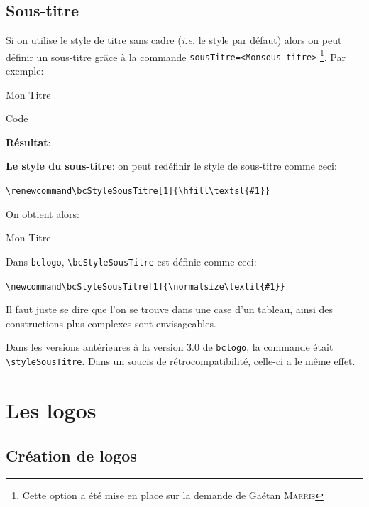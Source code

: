 \documentclass[a4paper,10pt,frenchb]{article}
\newenvironment*{demo}{%
\VerbatimOut{toto.txt}%
}%
{%
\endVerbatimOut%
\begin{bclogo}[margeG=1,logo=\bccrayon,couleurBarre=Gray,barre=wave,noborder]{Code}%
\begin{footnotesize}%
%
\end{footnotesize}%
\end{bclogo}%
\noindent\textbf{Résultat}:\par\smallskip
%
}%
\newcommand*\cmd{\color{Maroon}}%
\begin{document}
\subsection{Sous-titre}

Si on utilise le style de titre sans cadre (\textit{i.e.} le style par
défaut) alors on peut définir un sous-titre grâce à la commande
{\cmd\verb|sousTitre=<Monsous-titre>|}
\footnote{Cette option a été mise en place sur la demande de Gaétan
\textsc{Marris}}. Par exemple:

\begin{demo}
\begin{bclogo}[couleur=blue!30,arrondi=0.1,sousTitre=Sous-titre]{Mon Titre}%
  \lipsum[2]
\end{bclogo}
\end{demo}

\noindent\textbf{Le style du sous-titre}: on peut redéfinir le style
de sous-titre comme ceci:

\hfil{\cmd\verb|\renewcommand\bcStyleSousTitre[1]{\hfill\textsl{#1}}|}\hfil

\renewcommand\bcStyleSousTitre[1]{\hfill\textsl{#1}}

On obtient alors:

\begin{bclogo}[couleur=blue!30,arrondi=0.1,sousTitre=Sous-titre]{Mon Titre}
  \lipsum[2]
\end{bclogo}

Dans \texttt{bclogo}, \verb+\bcStyleSousTitre+ est définie comme ceci:

\hfil{\cmd\verb|\newcommand\bcStyleSousTitre[1]{\normalsize\textit{#1}}|}\hfil

\renewcommand\bcStyleSousTitre[1]{\normalsize\textit{#1}}

Il faut juste se dire que l'on se trouve dans une case d'un tableau,
ainsi des constructions plus complexes sont envisageables.

Dans les versions antérieures à la
version 3.0 de \texttt{bclogo}, la commande était
\verb+\styleSousTitre+. Dans un soucis de rétrocompatibilité,
celle-ci a le même effet.

\section{Les logos}

\subsection{Création de logos}
\end{document}
